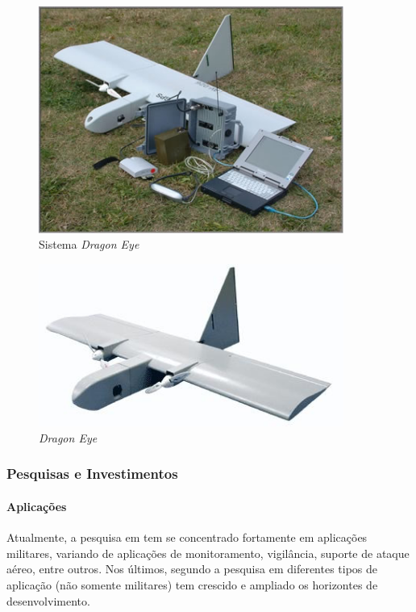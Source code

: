 \begin{figure}[h!]
\centering
\includegraphics[width=10cm]{pictures/dragon_eye_system.jpg}
\caption{Sistema \emph{Dragon Eye} }
 \label{fig:de_system}
\end{figure}

\begin{figure}[h!]
\centering
\includegraphics[width=10cm]{pictures/dragon_eye.jpg}
\caption{ \emph{Dragon Eye} }
 \label{fig:dragon_eye}
\end{figure}



\subsubsection{Pesquisas e Investimentos}

\paragraph{Aplicações}
Atualmente, a pesquisa em \vants tem se concentrado fortamente em aplicações militares, variando de aplicações de monitoramento, vigilância, suporte de ataque aéreo, entre outros. Nos últimos, segundo \cite{??} a pesquisa em diferentes tipos de aplicação (não somente militares) tem crescido e ampliado os horizontes de desenvolvimento.

